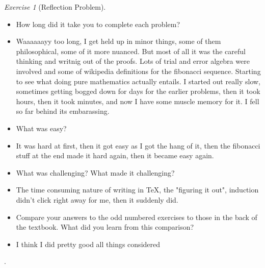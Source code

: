\documentclass[12pt]{amsart}
\makeatletter
\theoremstyle{remark}
\newtheorem*{exercise}{Exercise}%
\renewenvironment{proof}[1][\proofname]{\par\doublespacing
  \pushQED{\qed}%
  \normalfont \topsep6\p@\@plus6\p@\relax
  \list{}{%
    \settowidth{\leftmargin}{\itshape\proofname:\hskip\labelsep}%
    \setlength{\labelwidth}{0pt}%
    \setlength{\itemindent}{-\leftmargin}%
  }%
  \item[\hskip\labelsep\itshape#1\@addpunct{:}]\ignorespaces
}{%
  \popQED\endlist\@endpefalse
  \singlespacing
}
\theoremstyle{mycomment}
\makeatother
\begin{document}
\begin{exercise}[Reflection Problem] \ 
\begin{itemize}
\item How long did it take you to complete each problem? 
\begin{proof}[Answer]
  Waaaaaayy too long, I get held up in minor things, some of them philosophical, some of it more nuanced. But most of all it was the careful thinking and writnig out of the proofs. Lots of trial and error algebra were involved and some of wikipedia definitions for the fibonacci sequence. Starting to see what doing pure mathematics actually entails. I started out really slow, sometimes getting bogged down for days for the earlier problems, then it took hours, then it took minutes, and now I have some muscle memory for it. I fell so far behind its embarassing.
\end{proof}
\item What was easy?
\begin{proof}[Answer]
  It was hard at first, then it got easy as I got the hang of it, then the fibonacci stuff at the end made it hard again, then it became easy again.
\end{proof}
\item What was challenging? What made it challenging?
\begin{proof}[Answer]
  The time consuming nature of writing in TeX, the "figuring it out", induction didn't click right away for me, then it suddenly did.
\end{proof}
\item Compare your answers to the odd numbered exercises to those in the back of the textbook. What did you learn from this comparison?
\begin{proof}[Answer]
  I think I did pretty good all things considered
\end{proof}
\end{itemize}
\end{exercise}.















 
\end{document}
